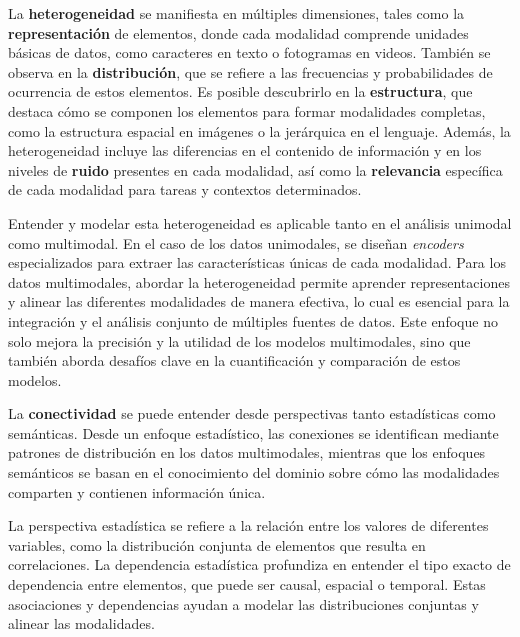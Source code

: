 \documentclass[../tesis.tex]{subfiles}
\begin{document}
La \textbf{heterogeneidad} se manifiesta en múltiples dimensiones, tales como la \textbf{representación} de elementos, donde cada modalidad comprende unidades básicas de datos, como caracteres en texto o fotogramas en videos. También se observa en la \textbf{distribución}, que se refiere a las frecuencias y probabilidades de ocurrencia de estos elementos. Es posible descubrirlo en la \textbf{estructura}, que destaca cómo se componen los elementos para formar modalidades completas, como la estructura espacial en imágenes o la jerárquica en el lenguaje. Además, la heterogeneidad incluye las diferencias en el contenido de información y en los niveles de \textbf{ruido} presentes en cada modalidad, así como la \textbf{relevancia} específica de cada modalidad para tareas y contextos determinados.\par\null\par

Entender y modelar esta heterogeneidad es aplicable tanto en el análisis unimodal como multimodal. En el caso de los datos unimodales, se diseñan \textit{encoders} especializados para extraer las características únicas de cada modalidad. Para los datos multimodales, abordar la heterogeneidad permite aprender representaciones y alinear las diferentes modalidades de manera efectiva, lo cual es esencial para la integración y el análisis conjunto de múltiples fuentes de datos. Este enfoque no solo mejora la precisión y la utilidad de los modelos multimodales, sino que también aborda desafíos clave en la cuantificación y comparación de estos modelos.\par\null\par

La \textbf{conectividad} se puede entender desde perspectivas tanto estadísticas como semánticas. Desde un enfoque estadístico, las conexiones se identifican mediante patrones de distribución en los datos multimodales, mientras que los enfoques semánticos se basan en el conocimiento del dominio sobre cómo las modalidades comparten y contienen información única.\par\null\par

La perspectiva estadística se refiere a la relación entre los valores de diferentes variables, como la distribución conjunta de elementos que resulta en correlaciones. La dependencia estadística profundiza en entender el tipo exacto de dependencia entre elementos, que puede ser causal, espacial o temporal. Estas asociaciones y dependencias ayudan a modelar las distribuciones conjuntas y alinear las modalidades.\par\null\par
\end{document}
